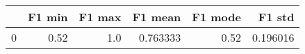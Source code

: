 \begin{tabular}{lrrrrr}
\toprule
{} &  F1 min &  F1 max &   F1 mean &  F1 mode &    F1 std \\
\midrule
0 &    0.52 &     1.0 &  0.763333 &     0.52 &  0.196016 \\
\bottomrule
\end{tabular}
